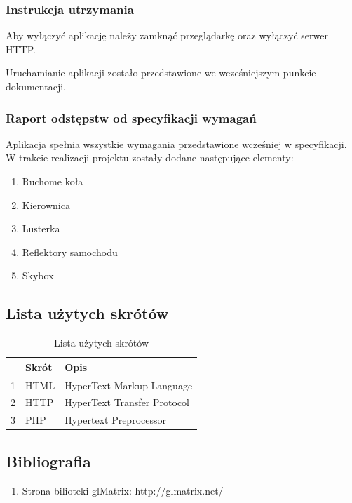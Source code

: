 \documentclass[11pt]{article}
\let\Oldsubsection\subsection
\renewcommand{\subsection}{\FloatBarrier\Oldsubsection}
\let\Oldsubsubsection\subsubsection
\renewcommand{\subsubsection}{\FloatBarrier\Oldsubsubsection}
\begin{document}
\subsubsection{Instrukcja utrzymania}
\par
Aby wyłączyć aplikację należy zamknąć przeglądarkę oraz wyłączyć serwer HTTP.
\par
Uruchamianie aplikacji zostało przedstawione we wcześniejszym punkcie dokumentacji.
\par

\subsubsection{Raport odstępstw od specyfikacji wymagań}
\par
Aplikacja spełnia wszystkie wymagania przedstawione wcześniej w specyfikacji. W trakcie realizacji projektu zostały dodane następujące elementy:
\begin{enumerate}
\item Ruchome koła
\item Kierownica
\item Lusterka
\item Reflektory samochodu
\item Skybox
\end{enumerate}

\subsection{Lista użytych skrótów}

\begin{table}[!h]
\centering
\caption{Lista użytych skrótów}
\label{my-label}
\begin{tabularx}{\textwidth}{|X|X|X|}
\hline
\rowcolor[HTML]{C0C0C0} 
\multicolumn{1}{|l|}{\cellcolor[HTML]{C0C0C0}Lp} & \multicolumn{1}{l|}{\cellcolor[HTML]{C0C0C0}Skrót} & \multicolumn{1}{l|}{\cellcolor[HTML]{C0C0C0}Opis}                               \\ \hline
1                                                & HTML                                                & HyperText Markup Language \\\hline
2                                                & HTTP                                           & HyperText Transfer Protocol \\\hline
3                                                & PHP                                                 & Hypertext Preprocessor \\\hline
\end{tabularx}
\end{table}


\subsection{Bibliografia}
\begin{enumerate}
\item Strona bilioteki glMatrix: http://glmatrix.net/
\end{enumerate}
\end{document}

